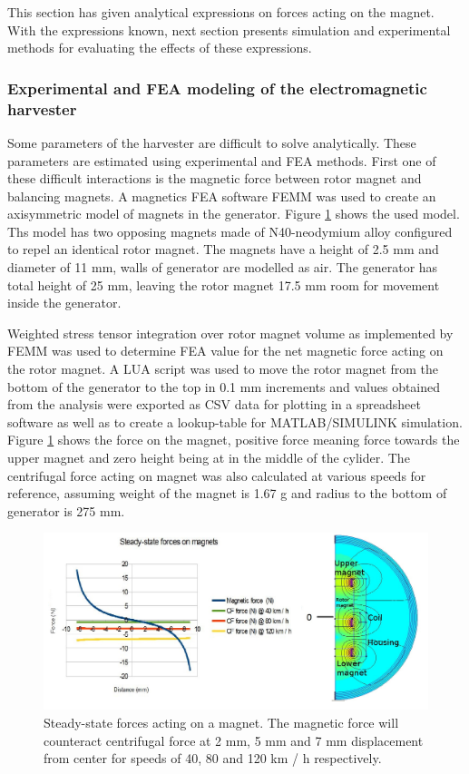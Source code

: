 This section has given analytical expressions on forces acting on the magnet. With the expressions known, next section presents simulation and experimental methods for evaluating the effects of these expressions.

\subsubsection{Experimental and FEA modeling of the electromagnetic harvester}
Some parameters of the harvester are difficult to solve analytically. These parameters are estimated using experimental and FEA methods. First one of these difficult interactions is the magnetic force between rotor magnet and balancing magnets. A magnetics FEA software FEMM \cite{Meeker2013} was used to create an axisymmetric model of magnets in the generator. Figure \ref{femm_forces} shows the used model. Ths model has two opposing magnets made of N40-neodymium alloy configured to repel an identical rotor magnet. The magnets have a height of 2.5 mm and diameter of 11 mm, walls of generator are modelled as air. The generator has total height of 25 mm, leaving the rotor magnet 17.5 mm room for movement inside the generator.

Weighted stress tensor integration over rotor magnet volume as implemented by FEMM was used to determine FEA value for the net magnetic force acting on the rotor magnet. A LUA script was used to move the rotor magnet from the bottom of the generator to the top in 0.1 mm increments and values obtained from the analysis were exported as CSV data for plotting in a spreadsheet software as well as to create a lookup-table for MATLAB/SIMULINK simulation. Figure \ref{femm_forces} shows the force on the magnet, positive force meaning force towards the upper magnet and zero height being at in the middle of the cylider. The centrifugal force acting on magnet was also calculated at various speeds for reference, assuming weight of the magnet is 1.67 g and radius to the bottom of generator is 275 mm.

\begin{figure}[htb]
  \begin{center}
  \includegraphics[width=\columnwidth]{images/own_dwg/femm_fvsd_dualmagnet.jpg}
  \end{center}
  \caption{\label{femm_forces} Steady-state forces acting on a magnet. The magnetic force will counteract centrifugal force at 2 mm, 5 mm and 7 mm displacement from center for speeds of 40, 80 and 120 km / h respectively.}
\end{figure}

